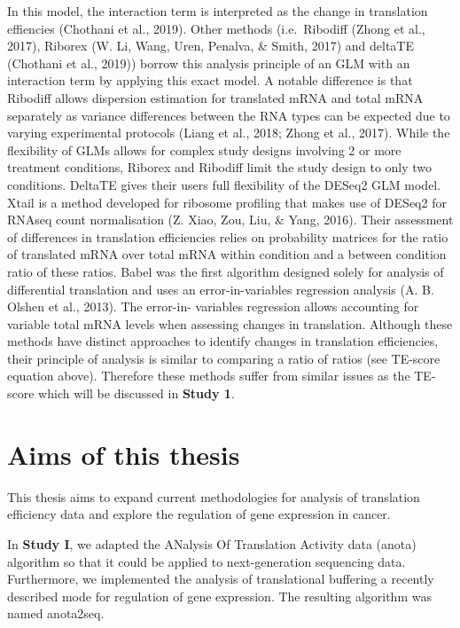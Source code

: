 \documentclass[12pt,openany]{book}
\begin{document}
In this model, the interaction term is interpreted as the change in
translation effiencies (Chothani et al., 2019). Other methods
(i.e.~Ribodiff (Zhong et al., 2017), Riborex (W. Li, Wang, Uren,
Penalva, \& Smith, 2017) and deltaTE (Chothani et al., 2019)) borrow
this analysis principle of an GLM with an interaction term by applying
this exact model. A notable difference is that Ribodiff allows
dispersion estimation for translated mRNA and total mRNA separately as
variance differences between the RNA types can be expected due to
varying experimental protocols (Liang et al., 2018; Zhong et al., 2017).
While the flexibility of GLMs allows for complex study designs involving
2 or more treatment conditions, Riborex and Ribodiff limit the study
design to only two conditions. DeltaTE gives their users full
flexibility of the DESeq2 GLM model. Xtail is a method developed for
ribosome profiling that makes use of DESeq2 for RNAseq count
normalisation (Z. Xiao, Zou, Liu, \& Yang, 2016). Their assessment of
differences in translation efficiencies relies on probability matrices
for the ratio of translated mRNA over total mRNA within condition and a
between condition ratio of these ratios. Babel was the first algorithm
designed solely for analysis of differential translation and uses an
error-in-variables regression analysis (A. B. Olshen et al., 2013). The
error-in- variables regression allows accounting for variable total mRNA
levels when assessing changes in translation. Although these methods
have distinct approaches to identify changes in translation
efficiencies, their principle of analysis is similar to comparing a
ratio of ratios (see TE-score equation above). Therefore these methods
suffer from similar issues as the TE-score which will be discussed in
\textbf{Study 1}.

\chapter{Aims of this thesis}

This thesis aims to expand current methodologies for analysis of
translation efficiency data and explore the regulation of gene
expression in cancer.

In \textbf{Study I}, we adapted the ANalysis Of Translation Activity
data (anota) algorithm so that it could be applied to next-generation
sequencing data. Furthermore, we implemented the analysis of
translational buffering a recently described mode for regulation of gene
expression. The resulting algorithm was named anota2seq.
\end{document}
